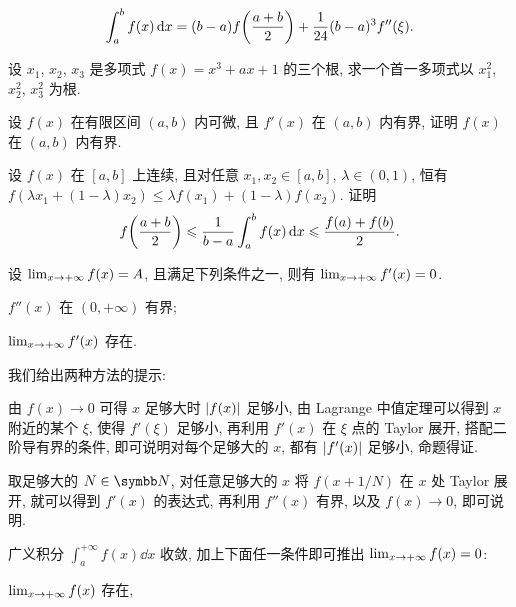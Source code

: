 \documentclass{ctexart}
\begin{document}
\begin{exercise}[series=exer]
    \begin{align*}
        \int_{a}^{b} f(x) \dd{x} = (b - a) f\qty(\frac{a + b}{2}) + \frac{1}{24}(b - a)^{3} f''(\xi).
    \end{align*}
    \item 设 $ x_{1} $, $ x_{2} $, $ x_{3} $ 是多项式 $ f(x) = x^{3} + ax + 1 $ 的三个根, 求一个首一多项式以 $ x_{1}^{2} $, $ x_{2}^{2} $, $ x_{3}^{2} $ 为根.
    \item 设 $ f(x) $ 在有限区间 $ (a, b) $ 内可微, 且 $ f'(x) $ 在 $ (a, b) $ 内有界, 证明 $ f(x) $ 在 $ (a, b) $ 内有界.
    \item 设 $ f(x) $ 在 $ [a, b] $ 上连续, 且对任意 $ x_{1}, x_{2} \in [a, b] $, $ \lambda \in (0, 1) $, 恒有 $ f(\lambda x_{1} + (1-\lambda) x_{2}) \le \lambda f(x_{1}) + (1 - \lambda) f(x_{2}) $. 证明
    \begin{align*}
        f\qty(\frac{a+b}{2}) \leqslant \frac{1}{b - a}\int_{a}^{b} f(x) \dd{x} \leqslant \frac{f(a) + f(b)}{2}.
    \end{align*}
    \item 设 $ \lim_{x \to +\infty} f(x) = A $, 且满足下列条件之一, 则有 $ \lim_{x \to +\infty} f'(x) = 0 $.
    \begin{exercise}
        \item $ f''(x) $ 在 $ (0, +\infty) $ 有界;
        \item $ \lim_{x \to +\infty} f'(x) $ 存在.
    \end{exercise}
    \begin{hint}
        我们给出两种方法的提示:
        \begin{method}
            \item 由 $ f(x) \to 0 $ 可得 $ x $ 足够大时 $ \abs{f(x)} $ 足够小, 由 Lagrange 中值定理可以得到 $ x $ 附近的某个 $ \xi $, 使得 $ f'(\xi) $ 足够小, 再利用 $ f'(x) $ 在 $ \xi $ 点的 Taylor 展开, 搭配二阶导有界的条件, 即可说明对每个足够大的 $ x $, 都有 $ \abs{f'(x)} $ 足够小, 命题得证.
            \item 取足够大的 $ N\in \N $, 对任意足够大的 $ x $ 将 $ f(x+1/N) $ 在 $ x $ 处 Taylor 展开, 就可以得到 $ f'(x) $ 的表达式, 再利用 $ f''(x) $ 有界, 以及 $ f(x) \to 0 $, 即可说明.
        \end{method}  
    \end{hint}
    \item 广义积分 $ \int_{a}^{+\infty} f(x) \dd{x} $ 收敛, 加上下面任一条件即可推出 $ \lim_{x \to +\infty} f(x) = 0 $:
    \begin{exercise}
        \item $ \lim_{x \to +\infty} f(x) $ 存在,

\end{exercise}
\end{exercise}
\end{document}
